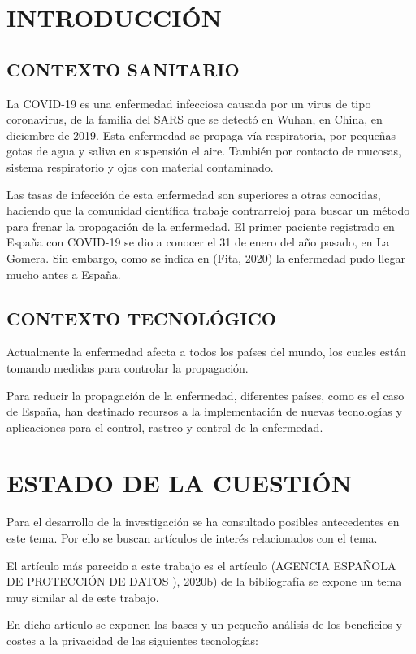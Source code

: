 \documentclass[11pt,a4paper,spanish]{article}
\begin{document}
\section{INTRODUCCIÓN}
\subsection{CONTEXTO SANITARIO}
La COVID-19 es una enfermedad infecciosa causada por un virus de tipo coronavirus, de la familia del SARS que se detectó en Wuhan, en China, en diciembre de 2019. Esta enfermedad se propaga vía respiratoria, por pequeñas gotas de agua y saliva en suspensión el aire. También por contacto de mucosas, sistema respiratorio y ojos con material contaminado.

Las tasas de infección de esta enfermedad son superiores a otras conocidas, haciendo que la comunidad científica trabaje contrarreloj para buscar un método para frenar la propagación de la enfermedad.
El primer paciente registrado en España con COVID-19 se dio a conocer el 31 de enero del año pasado, en La Gomera. Sin embargo, como se indica en (Fita, 2020) la enfermedad pudo llegar mucho antes a España.

\subsection{CONTEXTO TECNOLÓGICO}
Actualmente la enfermedad afecta a todos los países del mundo, los cuales están tomando medidas para controlar la propagación.

Para reducir la propagación de la enfermedad, diferentes países, como es el caso de España, han destinado recursos a la implementación de nuevas tecnologías y aplicaciones para el control, rastreo y control de la enfermedad.

\section{ESTADO DE LA CUESTIÓN}
Para el desarrollo de la investigación se ha consultado posibles antecedentes en este tema. Por ello se buscan artículos de interés relacionados con el tema.

El artículo más parecido a este trabajo es el artículo (AGENCIA ESPAÑOLA DE PROTECCIÓN DE DATOS                                                                                                                                ), 2020b) de la bibliografía se expone un tema muy similar al de este trabajo.

En dicho artículo se exponen las bases y un pequeño análisis de los beneficios y costes a la privacidad de las siguientes tecnologías:
\end{document}
